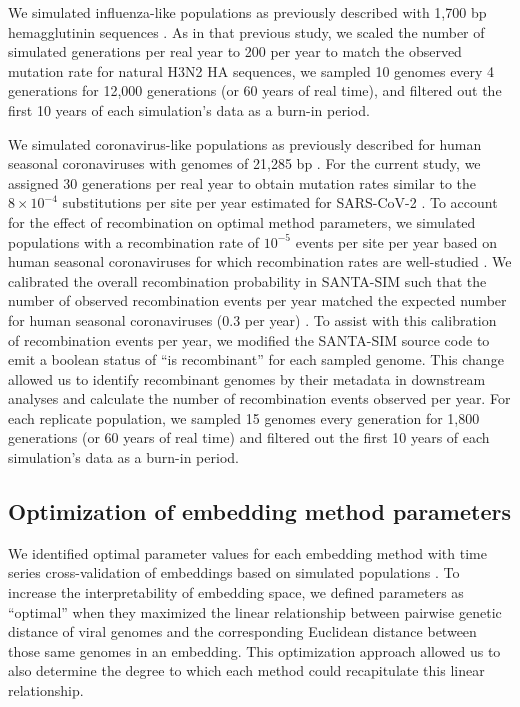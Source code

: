 \documentclass[webpdf,contemporary,large,single]{oup-authoring-template}%
\theoremstyle{thmstyleone}%
\theoremstyle{thmstyletwo}%
\theoremstyle{thmstylethree}%
\begin{document}
We simulated influenza-like populations as previously described with 1,700 bp hemagglutinin sequences \citep{Huddleston2020}.
As in that previous study, we scaled the number of simulated generations per real year to 200 per year to match the observed mutation rate for natural H3N2 HA sequences, we sampled 10 genomes every 4 generations for 12,000 generations (or 60 years of real time), and filtered out the first 10 years of each simulation's data as a burn-in period.

We simulated coronavirus-like populations as previously described for human seasonal coronaviruses with genomes of 21,285 bp \citep{Muller2022}.
For the current study, we assigned 30 generations per real year to obtain mutation rates similar to the $8 \times 10^{-4}$ substitutions per site per year estimated for SARS-CoV-2 \citep{Rambaut2020}.
To account for the effect of recombination on optimal method parameters, we simulated populations with a recombination rate of $10^{-5}$ events per site per year based on human seasonal coronaviruses for which recombination rates are well-studied \citep{Muller2022,Carabelli2023}.
We calibrated the overall recombination probability in SANTA-SIM such that the number of observed recombination events per year matched the expected number for human seasonal coronaviruses (0.3 per year) \citep{Muller2022}.
To assist with this calibration of recombination events per year, we modified the SANTA-SIM source code to emit a boolean status of ``is recombinant'' for each sampled genome.
This change allowed us to identify recombinant genomes by their metadata in downstream analyses and calculate the number of recombination events observed per year.
For each replicate population, we sampled 15 genomes every generation for 1,800 generations (or 60 years of real time) and filtered out the first 10 years of each simulation's data as a burn-in period.

\subsection{Optimization of embedding method parameters}

We identified optimal parameter values for each embedding method with time series cross-validation of embeddings based on simulated populations \citep{HyndmanAthanasopoulos2021}.
To increase the interpretability of embedding space, we defined parameters as ``optimal'' when they maximized the linear relationship between pairwise genetic distance of viral genomes and the corresponding Euclidean distance between those same genomes in an embedding.
This optimization approach allowed us to also determine the degree to which each method could recapitulate this linear relationship.
\end{document}

